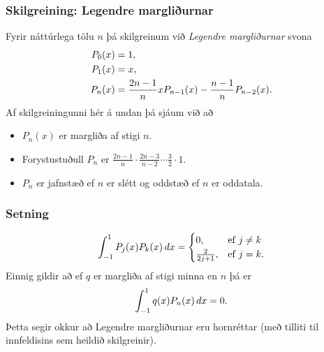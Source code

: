 \documentclass[a4paper,10pt,icelandic]{sphinxmanual}
\begin{document}
\subsubsection{Skilgreining: Legendre margliðurnar}
\label{kafli03:index-17}\label{kafli03:skilgreining-legendre-margliurnar}
Fyrir náttúrlega tölu \(n\) þá skilgreinum við
\emph{Legendre margliðurnar} svona
\begin{gather}
\begin{split}\begin{aligned}
   P_0(x) &= 1,\\
   P_1(x) &= x,\\
   P_n(x) &= \frac{2n-1}n x P_{n-1}(x) - \frac{n-1}n P_{n-2}(x).
  \end{aligned}\end{split}\notag
\end{gather}
Af skilgreiningunni hér á undan þá sjáum við að
\begin{itemize}
\item {} 
\(P_n(x)\) er margliða af stigi \(n\).

\item {} 
Forystustuðull \(P_n\) er
\(\frac {2n-1}n \cdot \frac {2n-3}{n-2} \cdots \frac 32 \cdot 1\).

\item {} 
\(P_n\) er jafnstæð ef \(n\) er slétt og oddstæð ef \(n\)
er oddatala.

\end{itemize}


\subsubsection{Setning}
\label{kafli03:id5}\begin{gather}
\begin{split}\int_{-1}^1 P_j(x) P_k(x)\, dx =
    \begin{cases}
     0, & \text{ef } j\neq k\\
     \frac{2}{2j+1}, & \text{ef } j=k.
    \end{cases}\end{split}\notag
\end{gather}
Einnig gildir að ef \(q\) er margliða af stigi minna en \(n\) þá er
\begin{gather}
\begin{split}\int_{-1}^1 q(x)P_n(x)\, dx = 0.\end{split}\notag
\end{gather}
Þetta segir okkur að Legendre margliðurnar eru hornréttar (með tilliti
til innfeldisins sem heildið skilgreinir).
\end{document}
